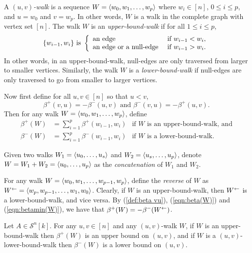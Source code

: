 \documentclass[runningheads]{llncs}
\begin{document}
\begin{definition}\label{def:bound-walk}
A \emph{$(u,v)$-walk} is a sequence $W=\langle w_0,w_1,\dots ,w_p\rangle$ where $w_i\in [n]$, $0\leq i\leq p$, and $u=w_0$ and $v=w_p$. In other words, $W$ is a walk in the complete graph with vertex set $[n]$. The walk $W$ is an \emph{upper-bound-walk} if for all $1\leq i\leq p$,
$$ \{ w_{i-1},w_i\} \text{ is }\left\{
\begin{array}{ll}
    \text{an edge } & \text{if } w_{i-1}<w_{i},  \\
    \text{an edge or a null-edge{} } & \text{if }w_{i-1}>w_{i}.
\end{array}
\right. 
$$ 
In other words, in an upper-bound-walk, null-edges are only traversed from larger to smaller vertices. 
Similarly, the walk $W$ is a \emph{lower-bound-walk} if null-edges are only traversed to go from smaller to larger vertices. 

Now first define for all $u,v\in [n]$ so that $u<v$,  
\begin{equation}\label{def:beta vu}
\beta^+(v,u)=-\beta^-(u,v)\mbox{ and }\beta^-(v,u)=-\beta^+(u,v).
\end{equation}
Then for any walk $W=\langle w_0, w_1,\dots , w_p\rangle$, define
\begin{eqnarray}
\beta^+ (W)&=\sum_{i=1}^p \beta^+(w_{i-1},w_i)&\mbox{if }W\mbox{ is an upper-bound-walk, and}\label{eqn:beta(W)}\\
\beta^- (W)&=\sum_{i=1}^p \beta^-(w_{i-1},w_i)&\mbox{if }W\mbox{ is a lower-bound-walk.}\label{eqn:betamin(W)}
\end{eqnarray}

Given two walks $W_1 = \langle u_0,\dots, u_s\rangle$ and $W_2 = \langle u_s, \dots, u_p\rangle$, denote $W = W_1 + W_2 = \langle u_0, \dots, u_p\rangle$ as the {\em concatenation} of $W_1$ and $W_2$.
\end{definition}


For any walk $W=\langle w_0,w_1,\dots ,w_{p-1},w_p\rangle$, define the \emph{reverse} of $W$ as $W^{\leftarrow}=\langle w_p,w_{p-1},\dots , w_1, w_0\rangle$. Clearly, if $W$ is an upper-bound-walk, then $W^{\leftarrow}$ is a lower-bound-walk, and vice versa. By (\ref{def:beta vu}), (\ref{eqn:beta(W)}) and (\ref{eqn:betamin(W)}), we have that  $\beta^+(W)=-\beta^-(W^{\leftarrow})$.%


\begin{lemma}\label{lemma: concatenation}
Let $A\in \mathcal{S}^n[k]$.
For any $u,v\in [n]$ and any $(u,v)$-walk $W$, if $W$ is an upper-bound-walk then $\beta^+(W)$ is an upper bound on $(u,v)$, and if $W$ is a $(u,v)$-lower-bound-walk then $\beta^-(W)$ is a lower bound on $(u,v)$.
\end{lemma}
\end{document}
